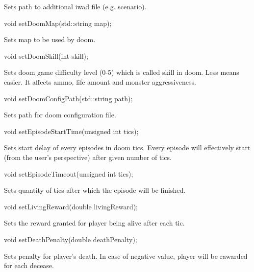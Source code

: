 Sets path to additional iwad file (e.g. scenario).


\vspace{20pt}
\begin{clinee}
void setDoomMap(std::string map);
\end{clinee}

Sets map to be used by doom.


\vspace{20pt}
\begin{clinee}      
void setDoomSkill(int skill);
\end{clinee}

Sets doom game difficulty level (0-5) which is called skill in doom. Less means easier. It affects ammo, life amount and monster aggressiveness. %


\vspace{20pt}
\begin{clinee}
void setDoomConfigPath(std::string path);
\end{clinee}

Sets path for doom configuration file.


\vspace{20pt}
\begin{clinee}    
void setEpisodeStartTime(unsigned int tics);
\end{clinee}

Sets start delay of every episodes in doom tics. Every episode will effectively start (from the user's perspective) after given number of tics.


\vspace{20pt}
\begin{clinee}
void setEpisodeTimeout(unsigned int tics);
\end{clinee}

Sets quantity of tics after which the episode will be finished.


\vspace{20pt}
\begin{clinee}
void setLivingReward(double livingReward);
\end{clinee}

Sets the reward granted for player being alive after each tic.


\vspace{20pt}
\begin{clinee}
void setDeathPenalty(double deathPenalty);
\end{clinee}

Sets penalty for player's death. In case of negative value, player will be rawarded for each decease.


